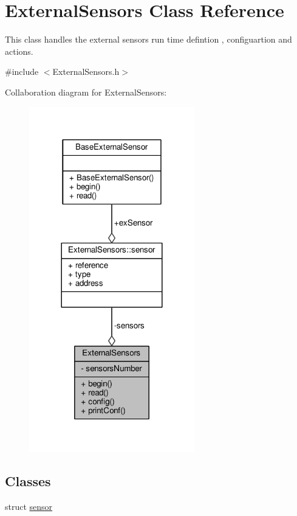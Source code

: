 \hypertarget{classExternalSensors}{}\section{External\+Sensors Class Reference}
\label{classExternalSensors}


This class handles the external sensors run time defintion , configuartion and actions.  




{\ttfamily \#include $<$External\+Sensors.\+h$>$}



Collaboration diagram for External\+Sensors\+:\nopagebreak
\begin{figure}[H]
\begin{center}
\leavevmode
\includegraphics[width=204pt]{classExternalSensors__coll__graph}
\end{center}
\end{figure}
\subsection*{Classes}
\begin{DoxyCompactItemize}
\item 
struct \hyperlink{structExternalSensors_1_1sensor}{sensor}
\end{DoxyCompactItemize}
